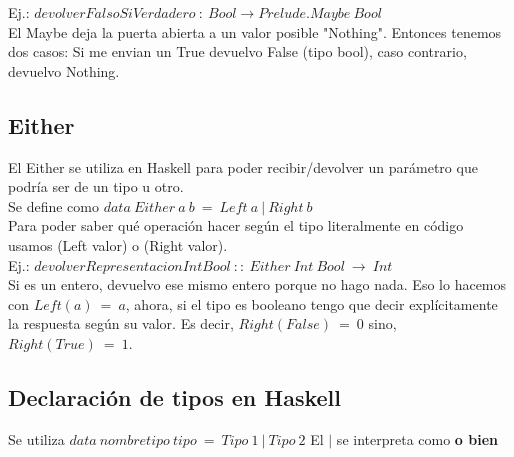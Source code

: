 \documentclass[10pt,a4paper]{article}
\begin{document}
Ej.: $ devolverFalsoSiVerdadero \:: \ Bool \rightarrow Prelude.Maybe \ Bool $ \\

El Maybe deja la puerta abierta a un valor posible "Nothing". Entonces tenemos dos casos: Si me envian un True devuelvo False (tipo bool), caso contrario, devuelvo Nothing. 

\subsection*{Either}
El Either se utiliza en Haskell para poder recibir/devolver un parámetro que podría ser de un tipo u otro. \\
Se define como $ data \ Either \ a \ b \ = \ Left \ a \ | \ Right \ b $ \\

Para poder saber qué operación hacer según el tipo literalmente en código usamos (Left valor) o (Right valor). \\

Ej.: $ devolverRepresentacionIntBool \ :: \ Either \ Int \ Bool \ \rightarrow \ Int $ \\

Si es un entero, devuelvo ese mismo entero porque no hago nada. Eso lo hacemos con $Left(a) \ = \ a$, ahora, si el tipo es booleano tengo que decir explícitamente la respuesta según su valor. Es decir, $Right(False) \ = \ 0$ sino, $Right(True) \ = \ 1$.

\subsection*{Declaración de tipos en Haskell}
Se utiliza $data \ nombretipo \ tipo \ = \ Tipo \ 1 \ | \ Tipo \ 2$ 
El $|$ se interpreta como \textbf{o bien}
\end{document}
